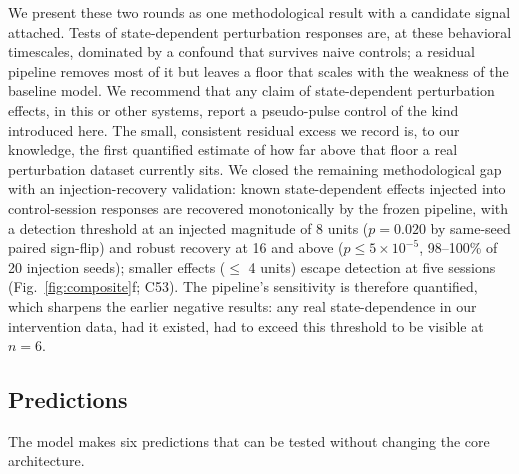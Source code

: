 \documentclass[pdflatex,sn-nature]{sn-jnl}
\begin{document}
We present these two rounds as one methodological result with a candidate signal attached. Tests of state-dependent perturbation responses are, at these behavioral timescales, dominated by a confound that survives naive controls; a residual pipeline removes most of it but leaves a floor that scales with the weakness of the baseline model. We recommend that any claim of state-dependent perturbation effects, in this or other systems, report a pseudo-pulse control of the kind introduced here. The small, consistent residual excess we record is, to our knowledge, the first quantified estimate of how far above that floor a real perturbation dataset currently sits. We closed the remaining methodological gap with an injection-recovery validation: known state-dependent effects injected into control-session responses are recovered monotonically by the frozen pipeline, with a detection threshold at an injected magnitude of 8 units ($p=0.020$ by same-seed paired sign-flip) and robust recovery at 16 and above ($p\le 5\times10^{-5}$, 98--100\% of 20 injection seeds); smaller effects ($\le$ 4 units) escape detection at five sessions (Fig.~\ref{fig:composite}f; C53). The pipeline's sensitivity is therefore quantified, which sharpens the earlier negative results: any real state-dependence in our intervention data, had it existed, had to exceed this threshold to be visible at $n=6$.

\subsection{Predictions}\label{sec:predictions}

The model makes six predictions that can be tested without changing the core architecture.
\end{document}
